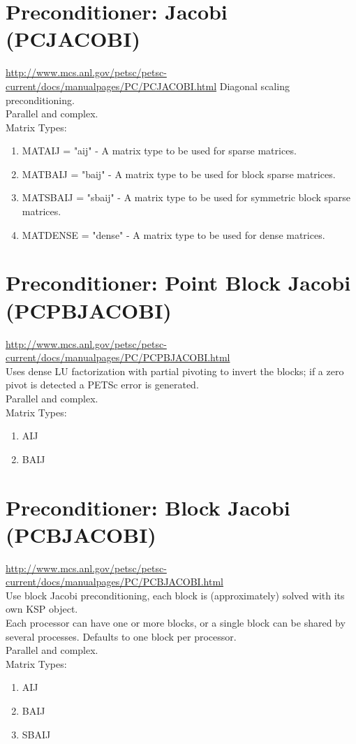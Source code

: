 \documentclass[]{scrartcl}
\begin{document}
{\section{Preconditioner: Jacobi (PCJACOBI)}
\url{http://www.mcs.anl.gov/petsc/petsc-current/docs/manualpages/PC/PCJACOBI.html}
Diagonal scaling preconditioning. \\
Parallel and complex. \\
Matrix Types:
\begin{enumerate}
	\item MATAIJ = "aij" - A matrix type to be used for sparse matrices.
	\item MATBAIJ = "baij" - A matrix type to be used for block sparse matrices.
	\item MATSBAIJ = "sbaij" - A matrix type to be used for symmetric block sparse matrices.
	\item MATDENSE = "dense" - A matrix type to be used for dense matrices.
\end{enumerate}
\section{Preconditioner: Point Block Jacobi (PCPBJACOBI)}
\url{http://www.mcs.anl.gov/petsc/petsc-current/docs/manualpages/PC/PCPBJACOBI.html} \\
Uses dense LU factorization with partial pivoting to invert the blocks; if a zero pivot is detected a PETSc error is generated. \\
Parallel and complex.\\
Matrix Types:
\begin{enumerate}
	\item AIJ
	\item BAIJ
\end{enumerate}
\section{Preconditioner: Block Jacobi (PCBJACOBI)}
\url{http://www.mcs.anl.gov/petsc/petsc-current/docs/manualpages/PC/PCBJACOBI.html} \\
Use block Jacobi preconditioning, each block is (approximately) solved with its own KSP object. \\
Each processor can have one or more blocks, or a single block can be shared by several processes. Defaults to one block per processor. \\
Parallel and complex.\\
Matrix Types:
\begin{enumerate}
	\item AIJ
	\item BAIJ
	\item SBAIJ
\end{enumerate}
}
\end{document}

